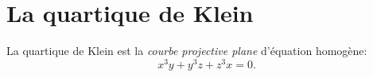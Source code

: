 \documentclass{article}
\begin{document}
\newcommand\C{\mathbb{C}}
\newcommand\R{\mathbb{R}}
\newcommand\N{\mathbb{N}}
\newcommand\D{\mathbb{D}}
\newcommand\Z{\mathbb{Z}}

\section{La quartique de Klein}
\label{sec:quartique}

La quartique de Klein est la
\emph{courbe projective plane}
d'équation homogène:
\begin{equation}
	x^3 y
	+
	y^3 z
	+
	z^3 x
	= 0
	.
\end{equation}
\end{document}

